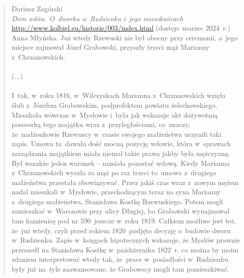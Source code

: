 \begin{quote}{Dariusz Zagórski \\ \null\hfill \emph{Dom wdów. O~dworku 
    w~Rudzienku i~jego mieszkańcach} \\ \null\hfill 
    \url{http://www.kolbiel.eu/historie/003/index.html} (dostęp: marzec 
    2024~r.)}
{Anna Młyńska. Już wtedy Rzewuski nie był obecny przy ceremonii, a~jego 
miejsce zajmował Józef Grabowski, przyszły trzeci mąż Marianny
z~Chrzanowskich.
\\
\\
(...)
\\
\\
I~tak, w~roku 1816, w~Wilczyskach Marianna z~Chrzanowskich wzięła ślub 
z~Józefem Grabowskim, podprefektem powiatu żelechowskiego. Mieszkała wówczas 
w~Mysłowie i~była jak wskazuje akt dożywotnią posesorką tego majątku wraz 
z~przyległościami, co~znaczy, że~małżonkowie Rzewuscy w~czasie swojego 
małżeństwa uczynili taki zapis. Umowa ta~dawała dość mocną pozycję wdowie, 
która w~sprawach zarządzania majątkiem miała niemal takie prawa jakby była 
mężczyzną. Był wszakże jeden warunek – musiała pozostać wdową. Kiedy Marianna 
z~Chrzanowskich wyszła za mąż po raz trzeci to~umowa z~drugiego małżeństwa 
przestała obowiązywać. Przez jakiś czas wraz z~nowym mężem nadal mieszkali 
w~Mysłowie, przechodzącym teraz na syna Marianny z~drugiego małżeństwa, 
Stanisława Kostkę Rzewuskiego. Potem mogli zamieszkać w~Warszawie przy ulicy 
Długiej, bo Grabowski wynajmował tam kamienicę pod nr 590~jeszcze w~roku 
1819. Całkiem możliwe jest też, że~już wtedy, czyli przed rokiem 1820~podjęto 
decyzję o~budowie dworu w~Rudzienku. Zapis w~księgach hipotecznych wskazuje, 
że Mysłów prawnie przeszedł na Stanisława Kostkę w~październiku 1822~r. co 
można by moim zdaniem interpretować wtedy tak, że~prace w~posiadłości 
w~Rudzienku były już na~tyle zaawansowane, że Grabowscy mogli tam 
pomieszkiwać.}
\end{quote}

